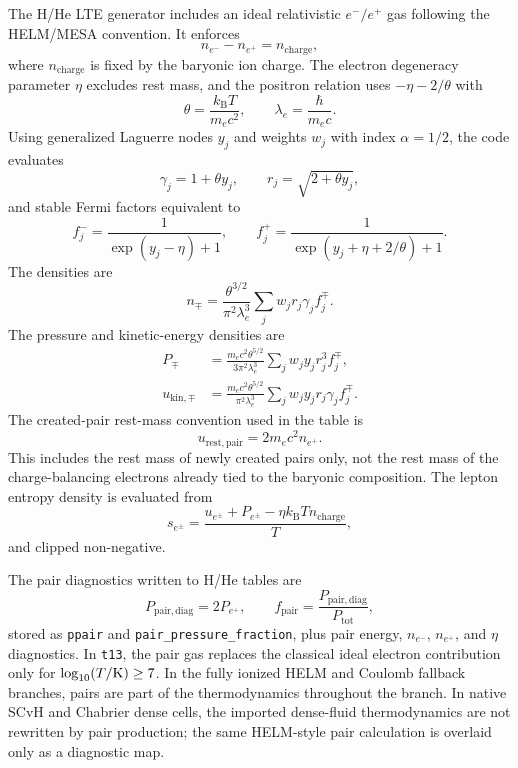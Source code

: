 \documentclass[11pt]{article}
\newcommand{\kb}{k_{\mathrm B}}
\newcommand{\me}{m_e}
\newcommand{\clight}{c}
\begin{document}
The H/He LTE generator includes an ideal relativistic $e^-/e^+$ gas following
the HELM/MESA convention.  It enforces
\begin{equation}
  n_{e^-}-n_{e^+}=n_{\mathrm{charge}},
\end{equation}
where $n_{\mathrm{charge}}$ is fixed by the baryonic ion charge.  The electron
degeneracy parameter $\eta$ excludes rest mass, and the positron relation uses
$-\eta-2/\theta$ with
\begin{equation}
  \theta=\frac{\kb T}{\me\clight^2}, \qquad
  \lambda_e=\frac{\hbar}{\me\clight}.
\end{equation}
Using generalized Laguerre nodes $y_j$ and weights $w_j$ with index
$\alpha=1/2$, the code evaluates
\begin{equation}
  \gamma_j = 1+\theta y_j,\qquad
  r_j=\sqrt{2+\theta y_j},
\end{equation}
and stable Fermi factors equivalent to
\begin{equation}
  f^-_j = \frac{1}{\exp(y_j-\eta)+1},
  \qquad
  f^+_j = \frac{1}{\exp(y_j+\eta+2/\theta)+1}.
\end{equation}
The densities are
\begin{equation}
  n_\mp =
  \frac{\theta^{3/2}}{\pi^2\lambda_e^3}
  \sum_j w_j r_j\gamma_j f^\mp_j .
\end{equation}
The pressure and kinetic-energy densities are
\begin{align}
  P_\mp &=
  \frac{\me\clight^2\theta^{5/2}}{3\pi^2\lambda_e^3}
  \sum_j w_j y_j r_j^3 f^\mp_j,
\\
  u_{\mathrm{kin},\mp} &=
  \frac{\me\clight^2\theta^{5/2}}{\pi^2\lambda_e^3}
  \sum_j w_j y_j r_j\gamma_j f^\mp_j.
\end{align}
The created-pair rest-mass convention used in the table is
\begin{equation}
  u_{\mathrm{rest,pair}} = 2\me\clight^2 n_{e^+}.
\end{equation}
This includes the rest mass of newly created pairs only, not the rest mass of
the charge-balancing electrons already tied to the baryonic composition.  The
lepton entropy density is evaluated from
\begin{equation}
  s_{e^\pm} =
  \frac{u_{e^\pm}+P_{e^\pm}-\eta\kb T n_{\mathrm{charge}}}{T},
\end{equation}
and clipped non-negative.

The pair diagnostics written to H/He tables are
\begin{equation}
  P_{\mathrm{pair,diag}}=2P_{e^+}, \qquad
  f_{\mathrm{pair}}=\frac{P_{\mathrm{pair,diag}}}{P_{\mathrm{tot}}},
\end{equation}
stored as \texttt{ppair} and \texttt{pair\_pressure\_fraction}, plus pair
energy, $n_{e^-}$, $n_{e^+}$, and $\eta$ diagnostics.  In \texttt{t13}, the
pair gas replaces the classical ideal electron contribution only for
$\log_{10}(T/{\rm K})\ge 7$.  In the fully ionized HELM and Coulomb fallback
branches, pairs are part of the thermodynamics throughout the branch.  In
native SCvH and Chabrier dense cells, the imported dense-fluid thermodynamics
are not rewritten by pair production; the same HELM-style pair calculation is
overlaid only as a diagnostic map.
\end{document}
